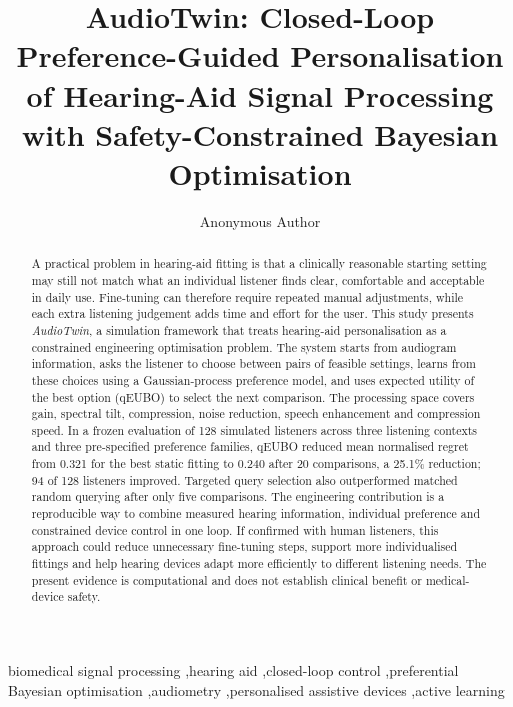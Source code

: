 \documentclass[preprint,12pt]{elsarticle}
\begin{document}
\begin{frontmatter}

\title{AudioTwin: Closed-Loop Preference-Guided Personalisation of Hearing-Aid Signal Processing with Safety-Constrained Bayesian Optimisation}

\author[anon]{Anonymous Author}
\address[anon]{Anonymous Institution}

\begin{abstract}
A practical problem in hearing-aid fitting is that a clinically reasonable starting setting may still not match what an individual listener finds clear, comfortable and acceptable in daily use. Fine-tuning can therefore require repeated manual adjustments, while each extra listening judgement adds time and effort for the user. This study presents \textit{AudioTwin}, a simulation framework that treats hearing-aid personalisation as a constrained engineering optimisation problem. The system starts from audiogram information, asks the listener to choose between pairs of feasible settings, learns from these choices using a Gaussian-process preference model, and uses expected utility of the best option (qEUBO) to select the next comparison. The processing space covers gain, spectral tilt, compression, noise reduction, speech enhancement and compression speed. In a frozen evaluation of 128 simulated listeners across three listening contexts and three pre-specified preference families, qEUBO reduced mean normalised regret from 0.321 for the best static fitting to 0.240 after 20 comparisons, a 25.1\% reduction; 94 of 128 listeners improved. Targeted query selection also outperformed matched random querying after only five comparisons. The engineering contribution is a reproducible way to combine measured hearing information, individual preference and constrained device control in one loop. If confirmed with human listeners, this approach could reduce unnecessary fine-tuning steps, support more individualised fittings and help hearing devices adapt more efficiently to different listening needs. The present evidence is computational and does not establish clinical benefit or medical-device safety.
\end{abstract}

\begin{keyword}
biomedical signal processing \sep hearing aid \sep closed-loop control \sep preferential Bayesian optimisation \sep audiometry \sep personalised assistive devices \sep active learning
\end{keyword}

\end{frontmatter}
\end{document}
